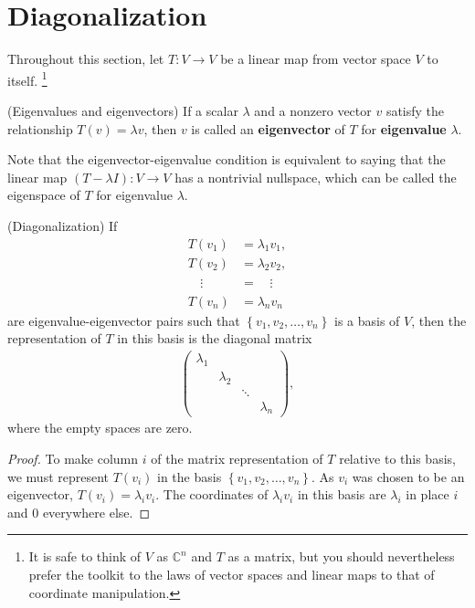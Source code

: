 \section{Diagonalization}
Throughout this section, let \(T: V\to V\) be a linear map from vector space \(V\) to itself.%
\footnote{It is safe to think of \(V\) as \(\mathbb{C}^{n}\) and \(T\) as a matrix, but you should nevertheless prefer the toolkit to the laws of vector spaces and linear maps to that of coordinate manipulation.}
\begin{definition}(Eigenvalues and eigenvectors)
  If a scalar \(\lambda\) and a nonzero vector \(v\) satisfy the relationship
  \(T(v) = \lambda v\),
  then \(v\) is called an \textbf{eigenvector} of \(T\) for \textbf{eigenvalue} \(\lambda\).
\end{definition}
Note that the eigenvector-eigenvalue condition is equivalent to saying that
the linear map
\((T - \lambda I): V \to V\)
has a nontrivial nullspace, which can be called the eigenspace of \(T\) for eigenvalue \(\lambda\).
\begin{theorem}(Diagonalization)
  If
  \begin{align*}
    T(v_1) &= \lambda_1 v_1,\\
    T(v_2) &= \lambda_2 v_2,\\
    \phantom{T(}\vdots \phantom{)}
    &= \phantom{\lambda_1}\vdots\\
    T(v_n) &= \lambda_n v_n
  \end{align*}
  are eigenvalue-eigenvector pairs such that
  \(\left\{v_1, v_2, \ldots, v_n\right\}\)
  is a basis of \(V\),
  then the representation of \(T\) in this basis is the diagonal matrix
  \begin{align*}
    \begin{pmatrix}
      \lambda_1 &           &         &           \\
                & \lambda_2 &         &           \\
                &           & \ddots  &           \\
                &           &         & \lambda_n
    \end{pmatrix},
  \end{align*}
  where the empty spaces are zero.
\end{theorem}
\begin{proof}
  To make column \(i\) of the matrix representation of \(T\) relative to this
  basis, we must represent \(T(v_i)\) in the basis
  \(\left\{v_1, v_2, \ldots, v_n\right\}\).
  As \(v_i\) was chosen to be an eigenvector, \(T(v_i) = \lambda_i v_i\).
  The coordinates of \(\lambda_i v_i\) in this basis are \(\lambda_i\) in place \(i\)
  and \(0\) everywhere else.
\end{proof}

